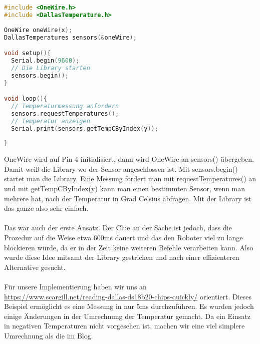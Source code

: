 \documentclass[12pt]{article}
\begin{document}
\begin{file}[DS18B20]
        \begin{lstlisting}[language=C++]
#include <OneWire.h>
#include <DallasTemperature.h>
		
OneWire oneWire(x);
DallasTemperatures sensors(&oneWire);

void setup(){
  Serial.begin(9600);	
  // Die Library starten
  sensors.begin();
}

void loop(){
  // Temperaturmessung anfordern
  sensors.requestTemperatures();	
  // Temperatur anzeigen
  Serial.print(sensors.getTempCByIndex(y));
  
}

        \end{lstlisting}
\end{file}
OneWire wird auf Pin 4 initialisiert, dann wird OneWire an sensors() übergeben. Damit weiß die Library wo der Sensor angeschlossen ist. Mit sensors.begin() startet man die Library. Eine Messung fordert man mit requestTemperatures() an und mit getTempCByIndex(y) kann man einen bestimmten Sensor, wenn man mehrere hat, nach der Temperatur in Grad Celsius abfragen. Mit der Library ist das ganze also sehr einfach.\\
\\
Das war auch der erste Ansatz. Der Clue an der Sache ist jedoch, dass die Prozedur auf die Weise etwa 600ms dauert und das den Roboter viel zu lange blockieren würde, da er in der Zeit keine weiteren Befehle verarbeiten kann. Also wurde diese Idee mitsamt der Library gestrichen und nach einer effizienteren Alternative gesucht.\\
\\ 
Für unsere Implementierung haben wir uns an\\ \url{https://www.scargill.net/reading-dallas-ds18b20-chips-quickly/} orientiert. Dieses Beispiel ermöglicht es eine Messung in nur 5ms durchzuführen. Es wurden jedoch einige Änderungen in der Umrechnung der Temperatur gemacht. Da ein Einsatz in negativen Temperaturen nicht vorgesehen ist, machen wir eine viel simplere Umrechnung als die im Blog. \\
\\
\end{document}
